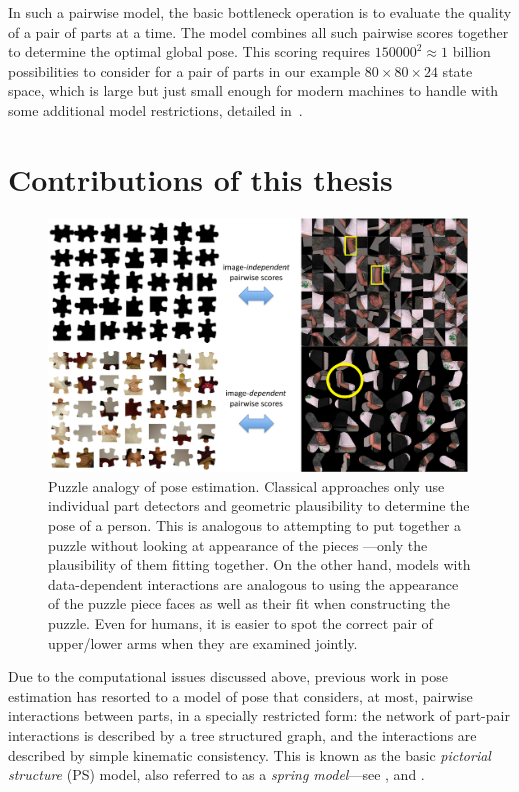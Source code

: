 In such a pairwise model, the basic bottleneck operation is to evaluate the 
quality of a pair of parts at a time. The model combines all such pairwise 
scores together to determine the optimal global pose.  This scoring requires 
$150000^2 \approx 1$ billion possibilities to consider for a pair of parts in 
our example $80 \times 80 \times 24$ state space, which is large but just small 
enough for modern machines to handle with some additional model restrictions, 
detailed in~.


\section{Contributions of this thesis}
\begin{figure}[t!]
\begin{center}
\includegraphics[width=0.99\textwidth]{figs/puzzle.pdf}
\caption[Puzzle analogy of pose estimation.]{Puzzle analogy of pose estimation.  
Classical approaches only use individual part detectors and geometric 
plausibility to determine the pose of a person.  This is analogous to 
attempting to put together a puzzle without looking at appearance of the pieces 
---only the plausibility of them fitting together. On the other hand, models 
with data-dependent interactions are analogous to using the appearance of the 
puzzle piece faces as well as their fit when constructing the puzzle.  Even for 
humans, it is easier to spot the correct pair of upper/lower arms when they are 
examined jointly.}
\label{fig:puzzle}
\end{center}
\end{figure}

Due to the computational issues discussed above, previous work in pose 
estimation has resorted to a model of pose that considers, at most, pairwise 
interactions between parts, in a specially restricted form: the network of 
part-pair interactions is described by a tree structured graph, and the 
interactions are described by simple kinematic consistency.  This is known as 
the basic {\em pictorial structure} (PS) model, also referred to as a {\em 
spring model}---see , and .  

